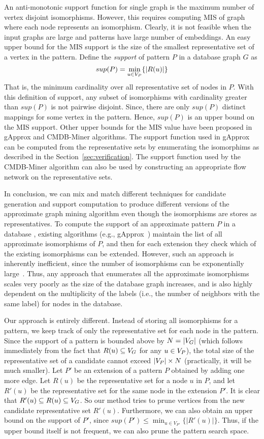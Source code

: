 An anti-monotonic support function for single graph is the maximum
number of vertex disjoint isomorphisms. However, this requires
computing MIS of graph where each node represents an isomorphism. Clearly,
it is not feasible when the input graphs are large and patterns have
large number of embeddings. An easy upper bound for the MIS support is the 
size of the smallest representative set of a vertex in the pattern.
Define the {\em
support} of pattern $P$ in a database graph $G$ as 
$$sup(P) = \min_{u \in
V_P} \{ |R(u)| \}$$
That is, the minimum cardinality over all representative set of nodes in $P$. 
With this definition of support, any subset of isomorphisms with cardinality
greater than $sup(P)$ is not pairwise disjoint. Since, there are
only $sup(P)$ distinct mappings for some vertex in the pattern. Hence, $sup(P)$
is an upper bound on the MIS support. Other upper bounds for the MIS value
have been proposed in gApprox and CMDB-Miner algorithms. The support 
function used in gApprox can be computed from the representative sets 
by enumerating the isomorphims as described in the Section~\ref{sec:verification}.
The support function used by the CMDB-Miner algorithm can also be
used by constructing an appropriate flow network on the representative sets.

In conclusion, we can mix and match different techniques for candidate generation
and support computation to produce different versions of the approximate
graph mining algorithm even though the isomorphisms are stores as
representatives.
To compute the support of an approximate pattern $P$ in a database \db,
existing algorithms (e.g., gApprox~\cite{gapprox}) maintain the list of
all approximate isomorphisms of $P$, and then for each extension they
check which of the existing isomorphisms can be extended. However, such an
approach is inherently inefficient, since the number of isomorphisms can
be exponentially large~\cite{2011-icdm}.  Thus, any approach that
enumerates all the approximate isomorphisms scales very poorly as the size
of the database graph increases, and is also highly dependent on the
multiplicity of the labels (i.e., the number of neighbors with the same
label) for nodes in the database.

Our approach is entirely different. Instead of storing all isomorphisms
for a pattern, we keep track of only the representative set for each
node in the pattern.  Since the support of a pattern is bounded above by
$N=|V_G|$ (which follows immediately from the fact that $R(u) \subseteq
V_G$ for any $u \in V_P$), the total size of the representative set of a
candidate cannot exceed $|V_P| \times N$ (practically, it will be much
smaller).  Let $P'$ be an extension of a pattern $P$ obtained by adding
one more edge. Let $R(u)$ be the representative set for a node $u$ in
$P$, and let $R'(u)$ be the representative set for the same node in the
extension $P'$. It is clear that $R'(u) \subseteq R(u) \subseteq V_G$.
So our method tries to prune vertices from the new candidate
representative set $R'(u)$. 
Furthermore, we can also obtain an upper
bound on the support of $P'$, since $sup(P') \le \min_{u \in V_{P'}}
\{|R'(u)|\}$. Thus, if the upper bound itself is not frequent, we can
also prune the pattern search space.
\fi
